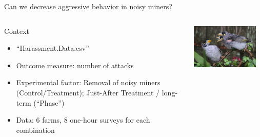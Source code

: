 \documentclass{beamer}
\begin{document}
\begin{frame}{Can we decrease aggressive behavior in noisy miners?}
\begin{columns}
 \begin{column}{0.6\textwidth}
 \begin{block}{Context}
  \begin{itemize}
    \item ``Harassment.Data.csv''
    \item Outcome measure: number of attacks\\
    \item Experimental factor: Removal of noisy miners (Control/Treatment); Just-After Treatment / long-term (``Phase'')\\
    \item Data: 6 farms, 8 one-hour surveys for each combination
    \end{itemize}
   \end{block}
  \end{column}
  \begin{column}{0.4\textwidth}
   \includegraphics[width=0.9\textwidth]{Figures/noisyminer}
  \end{column}

\end{columns}

 
\end{frame}
\end{document}
